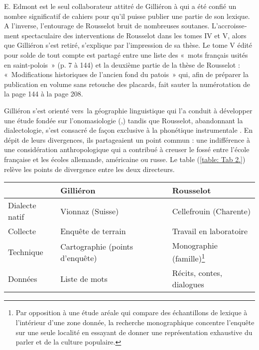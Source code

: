 \documentclass[french,output=paper,colorlinks,citecolor=brown]{../langscibook}
\begin{document}
\begin{otherlanguage}{french}
E. Edmont est le seul collaborateur attitré de Gilliéron à qui a été confié un nombre significatif de cahiers pour qu’il puisse publier une partie de son lexique. A l’inverse, l’entourage de Rousselot bruit de nombreuses soutanes. L’accroissement spectaculaire des interventions de Rousselot dans les tomes IV et V, alors que Gilliéron s’est retiré, s’explique par l’impression de sa thèse. Le tome V édité pour solde de tout compte est partagé entre une liste des «~mots français usités en saint-polois~» (p. 7 à 144) et la deuxième partie de la thèse de Rousselot : «~Modifications historiques de l’ancien fond du patois~» qui, afin de préparer la publication en volume sans retouche des placards, fait sauter la numérotation de la page 144 à la page 208.

Gilliéron s’est orienté vers~la géographie linguistique qui l’a conduit à développer une étude fondée sur l’onomasiologie (\citeyear{GilliéronMongin1905},\citeyear{Gilliéron1918}) tandis que Rousselot, abandonnant la dialectologie, s’est consacré de façon exclusive à la phonétique instrumentale \citeyear{Rousselot1897}. En dépit de leurs divergences, ils partageaient un point commun : une indifférence à une considération anthropologique qui a contribué à creuser le fossé entre l’école française et les écoles allemande, américaine ou russe. Le table (\ref{table: Tab 2.}) relève les points de divergence entre les deux directeurs.

\begin{table}    
\begin{tabularx}{\textwidth}{lQQ}
\lsptoprule
& Gilliéron        &       Rousselot \\\midrule

Dialecte natif  & Vionnaz (Suisse)    &   Cellefrouin (Charente) \\

Collecte & Enquête de terrain   &   Travail en laboratoire \\

Technique & Cartographie (points d’enquête)  &  Monographie (famille)\footnote{Par opposition à une étude aréale qui compare des échantillons de lexique à l’intérieur d’une zone donnée, la recherche monographique concentre l’enquête sur une seule localité en essayant de donner une représentation exhaustive du parler et de la culture populaire.}\\

Données &  Liste de mots   &     Récits, contes, dialogues\\


\end{tabularx}
\end{table}
\end{otherlanguage}
\end{document}
